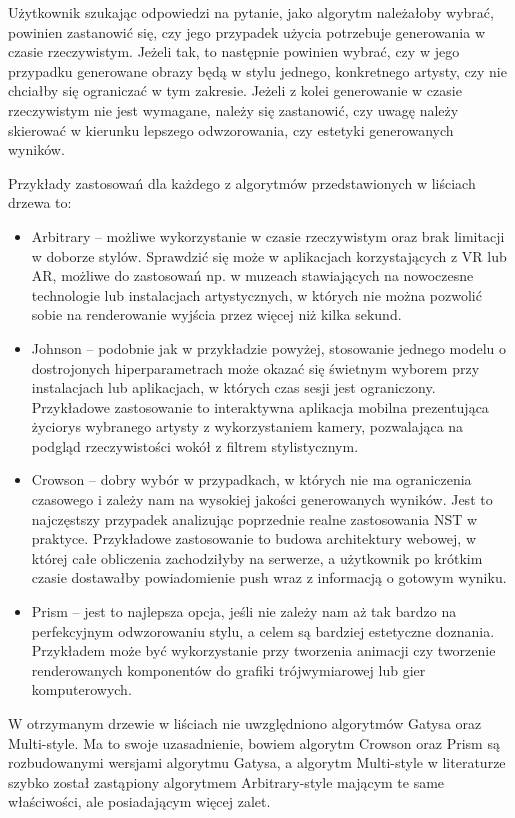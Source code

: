 \documentclass[12pt]{article}
\begin{document}
Użytkownik szukając odpowiedzi na pytanie, jako algorytm należałoby wybrać, powinien zastanowić się, czy jego przypadek użycia potrzebuje generowania w czasie rzeczywistym. Jeżeli tak, to następnie powinien wybrać, czy w jego przypadku generowane obrazy będą w stylu jednego, konkretnego artysty, czy nie chciałby się ograniczać w tym zakresie. Jeżeli z kolei generowanie w czasie rzeczywistym nie jest wymagane, należy się zastanowić, czy uwagę należy skierować w kierunku lepszego odwzorowania, czy estetyki generowanych wyników. 

Przykłady zastosowań dla każdego z algorytmów przedstawionych w liściach drzewa to:

\begin{itemize}
    \item Arbitrary – możliwe wykorzystanie w czasie rzeczywistym oraz brak limitacji w doborze stylów. Sprawdzić się może w aplikacjach korzystających z VR lub AR, możliwe do zastosowań np. w muzeach stawiających na nowoczesne technologie lub instalacjach artystycznych, w których nie można pozwolić sobie na renderowanie wyjścia przez więcej niż kilka sekund.
    \item Johnson – podobnie jak w przykładzie powyżej, stosowanie jednego modelu o dostrojonych hiperparametrach może okazać się świetnym wyborem przy instalacjach lub aplikacjach, w których czas sesji jest ograniczony. Przykładowe zastosowanie to interaktywna aplikacja mobilna prezentująca życiorys wybranego artysty z wykorzystaniem kamery, pozwalająca na podgląd rzeczywistości wokół z filtrem stylistycznym.
    \item Crowson – dobry wybór w przypadkach, w których nie ma ograniczenia czasowego i zależy nam na wysokiej jakości generowanych wyników. Jest to najczęstszy przypadek analizując poprzednie realne zastosowania NST w praktyce. Przykładowe zastosowanie to budowa architektury webowej, w której całe obliczenia zachodziłyby na serwerze, a użytkownik po krótkim czasie dostawałby powiadomienie push wraz z informacją o gotowym wyniku.
    \item Prism – jest to najlepsza opcja, jeśli nie zależy nam aż tak bardzo na perfekcyjnym odwzorowaniu stylu, a celem są bardziej estetyczne doznania. Przykładem może być wykorzystanie przy tworzenia animacji czy tworzenie renderowanych komponentów do grafiki trójwymiarowej lub gier komputerowych.
\end{itemize}
\indent

W otrzymanym drzewie w liściach nie uwzględniono algorytmów Gatysa oraz Multi-style. Ma to swoje uzasadnienie, bowiem algorytm Crowson oraz Prism są rozbudowanymi wersjami algorytmu Gatysa, a algorytm Multi-style w literaturze szybko został zastąpiony algorytmem Arbitrary-style mającym te same właściwości, ale posiadającym więcej zalet. 
\end{document}
